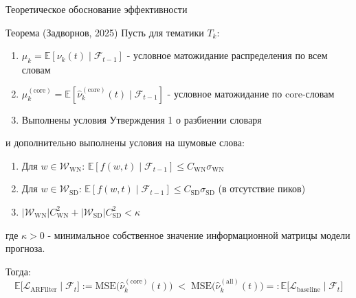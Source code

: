 \documentclass{beamer}
\begin{document}
\begin{frame}{Теоретическое обоснование эффективности}
\begin{block}{Теорема (Задворнов, 2025)}
\footnotesize
Пусть для тематики $T_k$:
\begin{enumerate}
    \item $\mu_k = \mathbb{E}[\nu_k(t) \mid \mathcal{F}_{t-1}]$ - условное матожидание распределения по всем словам
    \item $\mu_k^{(\mathrm{core})} = \mathbb{E}[\widehat{\nu}_k^{(\mathrm{core})}(t) \mid \mathcal{F}_{t-1}]$ - условное матожидание по core-словам
    \item Выполнены условия Утверждения 1 о разбиении словаря
\end{enumerate}
и дополнительно выполнены условия на шумовые слова:
\begin{enumerate}
    \item Для $w \in \mathcal{W}_{\mathrm{WN}}$: $\mathbb{E}[f(w,t) \mid \mathcal{F}_{t-1}] \leq C_{\mathrm{WN}} \sigma_{\mathrm{WN}}$ 
    \item Для $w \in \mathcal{W}_{\mathrm{SD}}$: $\mathbb{E}[f(w,t) \mid \mathcal{F}_{t-1}] \leq C_{\mathrm{SD}} \sigma_{\mathrm{SD}}$ (в отсутствие пиков)
    \item $|\mathcal{W}_{\mathrm{WN}}| C_{\mathrm{WN}}^2 + |\mathcal{W}_{\mathrm{SD}}| C_{\mathrm{SD}}^2 < \kappa$
\end{enumerate}
где $\kappa > 0$ - минимальное собственное значение информационной матрицы модели прогноза.

Тогда:
\[
  \mathbb{E}\!\bigl[\mathcal L_{\mathrm{ARFilter}}\mid \mathcal{F}_{t}\bigr]:=\mathrm{MSE}\bigl(\widehat{\nu}_k^{(\mathrm{core})}(t)\bigr)
  \;<\; 
  \mathrm{MSE}\bigl(\widehat{\nu}_k^{(\mathrm{all})}(t)\bigr) =:\mathbb{E}\!\bigl[\mathcal L_{\mathrm{baseline}}\mid \mathcal{F}_{t}\bigr]
\]
\normalsize
\end{block}

\end{frame}
\end{document}
